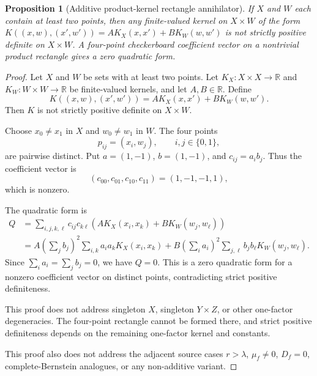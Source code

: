 \documentclass[11pt]{article}
\numberwithin{equation}{section}
\newtheorem{proposition}[theorem]{Proposition}
\theoremstyle{definition}
\theoremstyle{remark}
\newcommand{\1}{\mathbf 1}
\begin{document}
\begin{proposition}[Additive product-kernel rectangle annihilator]
\label{res:additive-product-kernel-rectangle-annihilator}
If \(X\) and \(W\) each contain at least two points, then any finite-valued kernel on \(X\times W\) of the form \(K((x,w),(x',w'))=A K_X(x,x')+B K_W(w,w')\) is not strictly positive definite on \(X\times W\). A four-point checkerboard coefficient vector on a nontrivial product rectangle gives a zero quadratic form.
\end{proposition}

\begin{proof}
Let \(X\) and \(W\) be sets with at least two points. Let \(K_X\colon X\times X\to\mathbb R\) and \(K_W\colon W\times W\to\mathbb R\) be finite-valued kernels, and let \(A,B\in\mathbb R\). Define
\[
K((x,w),(x',w'))=A K_X(x,x')+B K_W(w,w').
\]
Then \(K\) is not strictly positive definite on \(X\times W\).

Choose \(x_0\ne x_1\) in \(X\) and \(w_0\ne w_1\) in \(W\). The four points
\[
p_{ij}=(x_i,w_j),\qquad i,j\in\{0,1\},
\]
are pairwise distinct. Put \(a=(1,-1)\), \(b=(1,-1)\), and \(c_{ij}=a_i b_j\). Thus the coefficient vector is
\[
(c_{00},c_{01},c_{10},c_{11})=(1,-1,-1,1),
\]
which is nonzero.

The quadratic form is
\[
\begin{aligned}
Q
&=\sum_{i,j,k,\ell} c_{ij}c_{k\ell}
\left(AK_X(x_i,x_k)+BK_W(w_j,w_\ell)\right)\\
&=A\left(\sum_j b_j\right)^2\sum_{i,k}a_i a_kK_X(x_i,x_k)
+B\left(\sum_i a_i\right)^2\sum_{j,\ell}b_j b_\ell K_W(w_j,w_\ell).
\end{aligned}
\]
Since \(\sum_i a_i=\sum_j b_j=0\), we have \(Q=0\). This is a zero quadratic form for a nonzero coefficient vector on distinct points, contradicting strict positive definiteness.

This proof does not address singleton \(X\), singleton \(Y\times Z\), or other one-factor degeneracies. The four-point rectangle cannot be formed there, and strict positive definiteness depends on the remaining one-factor kernel and constants.

This proof also does not address the adjacent source cases \(r>\lambda\), \(\mu_f\ne0\), \(D_f=0\), complete-Bernstein analogues, or any non-additive variant.
\end{proof}
\end{document}
